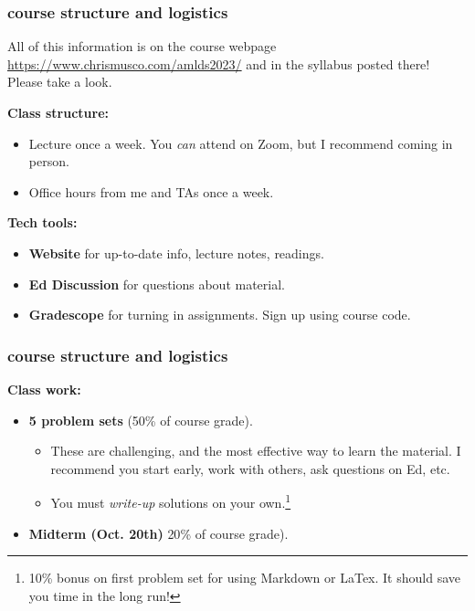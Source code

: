 \documentclass[]{beamer}
\begin{document}
	\begin{frame}
		\frametitle{course structure and logistics}
		\begin{center}
			All of this information is on the course webpage \url{https://www.chrismusco.com/amlds2023/} and in the syllabus posted there! Please take a look.
		\end{center}
		
		\textbf{Class structure:}
		\begin{itemize}
			\item Lecture once a week. You \emph{can} attend on Zoom, but I recommend coming in person.
			\item Office hours from me and TAs once a week.
		\end{itemize}
		
		\textbf{Tech tools:}
		\begin{itemize}
			\item \textbf{Website} for up-to-date info, lecture notes, readings.
			\item \textbf{Ed Discussion} for questions about material. 
			\item \textbf{Gradescope} for turning in assignments. Sign up using course code.
		\end{itemize}
		
		\begin{center}
		\end{center}
	\end{frame}
	
	
	
	\begin{frame}
		\frametitle{course structure and logistics}
		\textbf{Class work:}
		\begin{itemize}
			\item \textbf{5 problem sets} (50\% of course grade). 
			\begin{itemize}
				\item These are challenging, and the most effective way to learn the material. I recommend you start early, work with others, ask questions on Ed, etc.
				\item You must \emph{write-up} solutions on your own.\footnote{10\% bonus on first problem set for using Markdown or LaTex. It should save you time in the long run!} 
			\end{itemize}
			\item \textbf{Midterm (Oct. 20th)} {20}\% of course grade). 
		\end{itemize}
	\end{frame}
	
\end{document}

